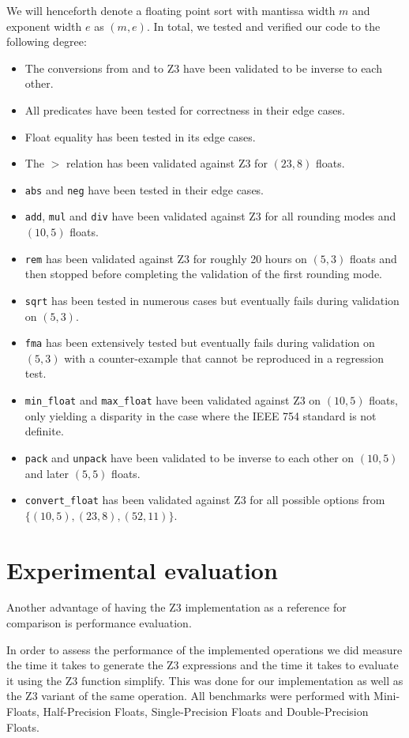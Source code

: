 \documentclass[a4paper,UKenglish,cleveref, autoref, thm-restate]{lipics-v2019}
\begin{document}
We will henceforth denote a floating point sort with mantissa width $m$ and exponent width $e$ as $(m, e)$. In total, we tested and verified our code to the following degree:
\begin{itemize}
	\item The conversions from and to Z3 have been validated to be inverse to each other.
	\item All predicates have been tested for correctness in their edge cases.
	\item Float equality has been tested in its edge cases.
	\item The $>$ relation has been validated against Z3 for $(23, 8)$ floats.
	\item \verb|abs| and \verb|neg| have been tested in their edge cases.
	\item \verb|add|, \verb|mul| and \verb|div| have been validated against Z3 for all rounding modes and $(10, 5)$ floats.
	\item \verb|rem| has been validated against Z3 for roughly 20 hours on $(5, 3)$ floats and then stopped before completing the validation of the first rounding mode.
	\item \verb|sqrt| has been tested in numerous cases but eventually fails during validation on $(5, 3)$.
	\item \verb|fma| has been extensively tested but eventually fails during validation on $(5, 3)$ with a counter-example that cannot be reproduced in a regression test.
	\item \verb|min_float| and \verb|max_float| have been validated against Z3 on $(10, 5)$ floats, only yielding a disparity in the case where the IEEE 754 standard is not definite.
	\item \verb|pack| and \verb|unpack| have been validated to be inverse to each other on $(10, 5)$ and later $(5, 5)$ floats.
	\item \verb|convert_float| has been validated against Z3 for all possible options from \\ $\{(10, 5), (23, 8), (52, 11)\}$.
\end{itemize}

\section{Experimental evaluation}
Another advantage of having the Z3 implementation as a reference for comparison is performance evaluation.

In order to assess the performance of the implemented operations we did measure the time it takes to generate the Z3 expressions and the time it takes to evaluate it using the Z3 function simplify. This was done for our implementation as well as the Z3 variant of the same operation. All benchmarks were performed with Mini-Floats, Half-Precision Floats, Single-Precision Floats and Double-Precision Floats.
\end{document}
